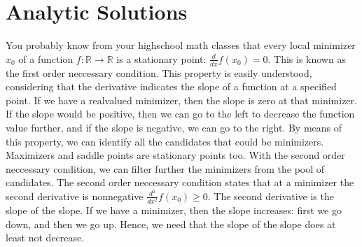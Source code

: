 \documentclass[letterpaper,10pt,english]{jupyterBook}
\begin{document}
\sphinxstepscope


\section{Analytic Solutions}
\label{\detokenize{optimization_analytic:analytic-solutions}}\label{\detokenize{optimization_analytic::doc}}
\sphinxAtStartPar
You probably know from your highschool math classes that every local minimizer \(x_0\) of a function \(f:\mathbb{R}\rightarrow\mathbb{R}\) is a stationary point: \(\frac{d}{dx}f(x_0)=0\). This is known as the first order neccessary condition. This property is easily understood, considering that the derivative indicates the slope of a function at a specified point. If we have a real\sphinxhyphen{}valued minimizer, then the slope is zero at that minimizer. If the slope would be positive, then we can go to the left to decrease the function value further, and if the slope is negative, we can go to the right. By means of this property, we can identify all the candidates that could be minimizers. Maximizers and saddle points are stationary points too. With the second order neccessary condition, we can filter further the minimizers from the pool of candidates. The second order neccessary condition states that at a minimizer the second derivative is nonnegative \(\frac{d^2}{dx^2}f(x_0)\geq 0\). The second derivative is the slope of the slope. If we have a minimizer, then the slope increases: first we go down, and then we go up. Hence, we need that the slope of the slope does at least not decrease.
\label{optimization_analytic:example-0}
\end{document}
